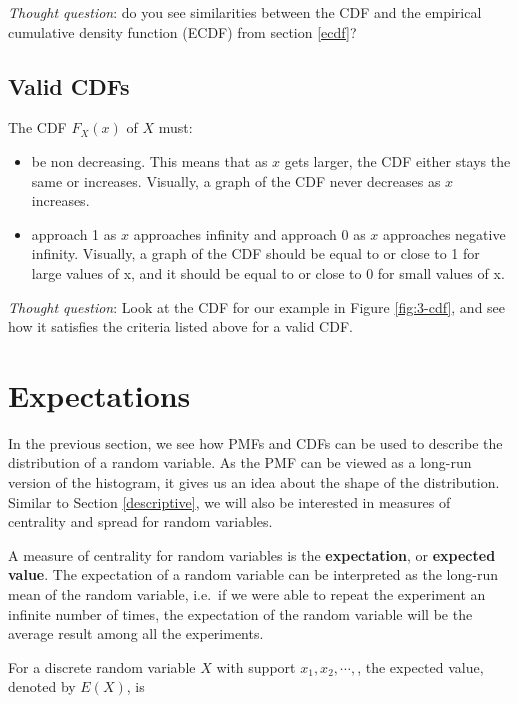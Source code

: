 \documentclass[
]{book}
\providecommand{\tightlist}{%
  \setlength{\itemsep}{0pt}\setlength{\parskip}{0pt}}
\begin{document}
\emph{Thought question}: do you see similarities between the CDF and the empirical cumulative density function (ECDF) from section \ref{ecdf}?

\hypertarget{valid-cdfs}{%
\subsection{Valid CDFs}\label{valid-cdfs}}

The CDF \(F_X(x)\) of \(X\) must:

\begin{itemize}
\tightlist
\item
  be non decreasing. This means that as \(x\) gets larger, the CDF either stays the same or increases. Visually, a graph of the CDF never decreases as \(x\) increases.
\item
  approach 1 as \(x\) approaches infinity and approach 0 as \(x\) approaches negative infinity. Visually, a graph of the CDF should be equal to or close to 1 for large values of x, and it should be equal to or close to 0 for small values of x.
\end{itemize}

\emph{Thought question}: Look at the CDF for our example in Figure \ref{fig:3-cdf}, and see how it satisfies the criteria listed above for a valid CDF.

\hypertarget{expectations}{%
\section{Expectations}\label{expectations}}

In the previous section, we see how PMFs and CDFs can be used to describe the distribution of a random variable. As the PMF can be viewed as a long-run version of the histogram, it gives us an idea about the shape of the distribution. Similar to Section \ref{descriptive}, we will also be interested in measures of centrality and spread for random variables.

A measure of centrality for random variables is the \textbf{expectation}, or \textbf{expected value}. The expectation of a random variable can be interpreted as the long-run mean of the random variable, i.e.~if we were able to repeat the experiment an infinite number of times, the expectation of the random variable will be the average result among all the experiments.

For a discrete random variable \(X\) with support \(x_1, x_2, \cdots,\), the expected value, denoted by \(E(X)\), is
\end{document}
